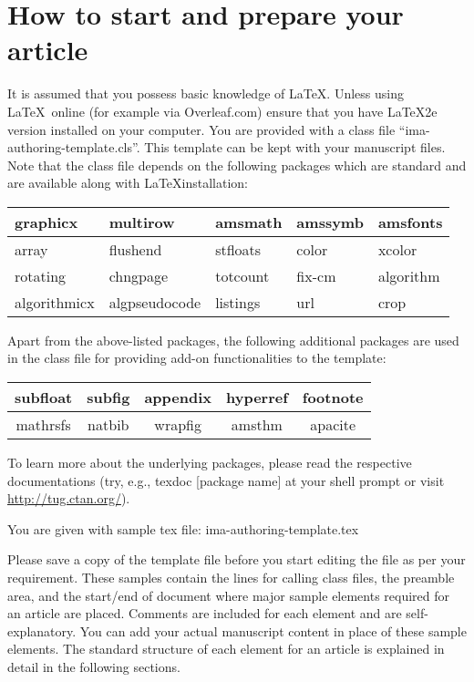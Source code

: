 \documentclass{article}
\begin{document}
\section{How to start and prepare your article  }
It is assumed that you possess basic knowledge of  \LaTeX. Unless using \LaTeX\ online (for example via Overleaf.com) ensure that you have \LaTeX2e version installed on your computer. You are provided with a class file ``ima-authoring-template.cls''. This template can be kept with your manuscript files. Note that the class file depends on the following packages which are standard and are available along with \LaTeX installation:

\begin{center}\begin{tabular}{|l|l|l|l|l|}\hline
graphicx & multirow & amsmath & amssymb & amsfonts \\\hline
array & flushend & stfloats & color & xcolor \\\hline
rotating & chngpage & totcount & fix-cm & algorithm \\\hline
algorithmicx & algpseudocode & listings & url & crop \\\hline
\end{tabular}\end{center}

Apart from the above-listed packages, the following additional packages are used in the class file for providing add-on functionalities to the template:

\begin{center}\begin{tabular}{|c|c|c|c|c|}\hline
subfloat & subfig & appendix & hyperref & footnote \\\hline
mathrsfs & natbib & wrapfig & amsthm & apacite \\\hline
\end{tabular}\end{center}

To learn more about the underlying packages, please read the respective documentations (try, e.g., texdoc [package name] at your shell prompt or visit \url{http://tug.ctan.org/}).

\medskip

\noindent You are given with sample tex file: ima-authoring-template.tex

\medskip

Please save a copy of the template file before you start editing the file as per your requirement. These samples contain the lines for calling class files, the preamble area, and the start/end of document where major sample elements required for an article are placed. Comments are included for each element and are self-explanatory. You can add your actual manuscript content in place of these sample elements. The standard structure of each element for an article is explained in detail in the following sections.
\end{document}
